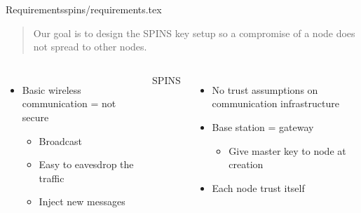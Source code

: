 \begin{notedFrame}{Requirements}{spins/requirements.tex}
    \begin{quote}
        Our goal is to design the SPINS key setup
        so a compromise of a node does not spread to other nodes.
    \end{quote}

    \begin{columns}[T, onlytextwidth]
            \begin{itemize}
                \item Basic wireless communication = not secure
                \begin{itemize}
                    \item Broadcast
                    \item Easy to eavesdrop the traffic
                    \item Inject new messages
                \end{itemize}
            \end{itemize}
                
                \alert{SPINS}
                \begin{itemize}
                    \item No trust assumptions on communication infrastructure
                    \item Base station = gateway
                    \begin{itemize}
                        \item Give master key to node at creation
                    \end{itemize}
                    \item Each node trust itself
                \end{itemize}
        \end{columns}
\end{notedFrame}

